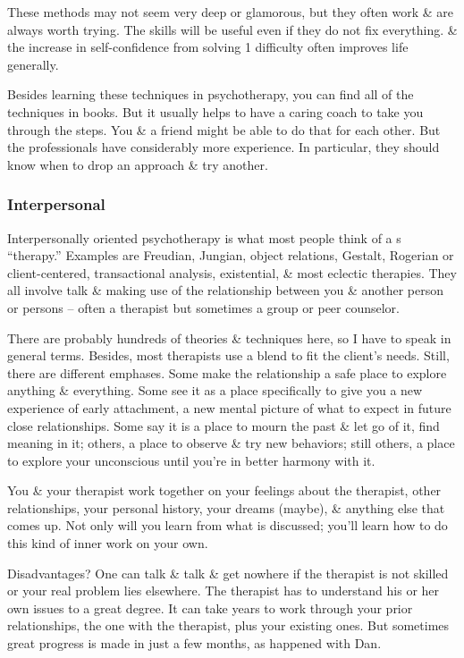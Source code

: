 \documentclass{article}
\numberwithin{equation}{section}
\begin{document}
These methods may not seem very deep or glamorous, but they often work \& are always worth trying. The skills will be useful even if they do not fix everything. \& the increase in self-confidence from solving 1 difficulty often improves life generally.

Besides learning these techniques in psychotherapy, you can find all of the techniques in books. But it usually helps to have a caring coach to take you through the steps. You \& a friend might be able to do that for each other. But the professionals have considerably more experience. In particular, they should know when to drop an approach \& try another.

\subsubsection{Interpersonal}
Interpersonally oriented psychotherapy is what most people think of a s ``therapy.'' Examples are Freudian, Jungian, object relations, Gestalt, Rogerian or client-centered, transactional analysis, existential, \& most eclectic therapies. They all involve talk \& making use of the relationship between you \& another person or persons -- often a therapist but sometimes a group or peer counselor.

There are probably hundreds of theories \& techniques here, so I have to speak in general terms. Besides, most therapists use a blend to fit the client's needs. Still, there are different emphases. Some make the relationship a safe place to explore anything \& everything. Some see it as a place specifically to give you a new experience of early attachment, a new mental picture of what to expect in future close relationships. Some say it is a place to mourn the past \& let go of it, find meaning in it; others, a place to observe \& try new behaviors; still others, a place to explore your unconscious until you're in better harmony with it.

You \& your therapist work together on your feelings about the therapist, other relationships, your personal history, your dreams (maybe), \& anything else that comes up. Not only will you learn from what is discussed; you'll learn how to do this kind of inner work on your own.

Disadvantages? One can talk \& talk \& get nowhere if the therapist is not skilled or your real problem lies elsewhere. The therapist has to understand his or her own issues to a great degree. It can take years to work through your prior relationships, the one with the therapist, plus your existing ones. But sometimes great progress is made in just a few months, as happened with Dan.
\end{document}
